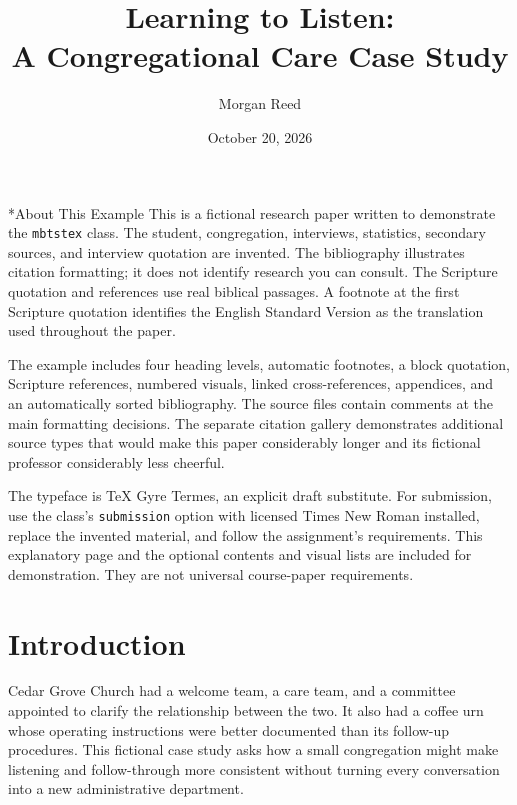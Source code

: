 \documentclass[font=termes]{mbts}
\title{Learning to Listen:\\A Congregational Care Case Study}
\author{Morgan Reed}
\date{October 20, 2026}
\begin{document}
\maketitle

\mbtsfrontmatter
\begin{mbtspage}*{About This Example}
This is a fictional research paper written to demonstrate the \texttt{mbtstex}
class. The student, congregation, interviews, statistics, secondary sources,
and interview quotation are invented. The bibliography illustrates citation
formatting; it does not identify research you can consult. The Scripture
quotation and references use real biblical passages. A footnote at the first
Scripture quotation identifies the English Standard Version as the translation
used throughout the paper.

The example includes four heading levels, automatic footnotes, a block
quotation, Scripture references, numbered visuals, linked cross-references,
appendices, and an automatically sorted bibliography. The source files contain
comments at the main formatting decisions. The separate citation gallery
demonstrates additional source types that would make this paper considerably
longer and its fictional professor considerably less cheerful.

The typeface is TeX Gyre Termes, an explicit draft substitute. For submission,
use the class's \texttt{submission} option with licensed Times New Roman
installed, replace the invented material, and follow the assignment's
requirements. This explanatory page and the optional contents and visual lists
are included for demonstration. They are not universal course-paper requirements.
\end{mbtspage}
\tableofcontents
\listoftables
\listoffigures
\listofgraphs
\mbtsmainmatter

\section{Introduction}
Cedar Grove Church had a welcome team, a care team, and a committee appointed
to clarify the relationship between the two. It also had a coffee urn whose
operating instructions were better documented than its follow-up procedures.
This fictional case study asks how a small congregation might make listening
and follow-through more consistent without turning every conversation into a
new administrative department.
\end{document}
